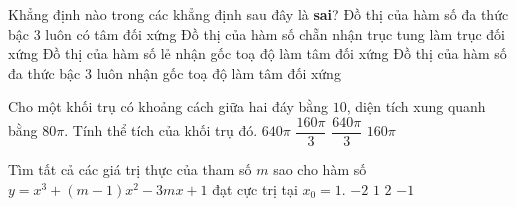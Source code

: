 \begin{ex}%
	Khẳng định nào trong các khẳng định sau đây là \textbf{sai}?
	\choice
	{Đồ thị của hàm số đa thức bậc $ 3 $ luôn có tâm đối xứng}
	{Đồ thị của hàm số chẵn nhận trục tung làm trục đối xứng}
	{Đồ thị của hàm số lẻ nhận gốc toạ độ làm tâm đối xứng}
	{ \True Đồ thị của hàm số đa thức bậc $ 3 $ luôn nhận gốc toạ độ làm tâm đối xứng}
\end{ex}
\begin{ex}%
	Cho một khối trụ có khoảng cách giữa hai đáy bằng $ 10 $, diện tích xung quanh bằng $ 80 \pi $. Tính thể tích của khối trụ đó.
	\choice
	{$ 640 \pi $}
	{$ \dfrac{160 \pi }{3} $}
	{$ \dfrac{640 \pi }{3} $}
	{ \True $ 160 \pi  $}
\end{ex}
\begin{ex}%
	Tìm tất cả các giá trị thực của tham số $ m $ sao cho hàm số $ y = x^3 + (m - 1)x^2 - 3mx + 1 $ đạt cực trị tại $ x_0 = 1 $.
	\choice
	{$ -2 $}
	{ \True $ 1 $}
	{$ 2 $}
	{$ -1 $}
\end{ex}
